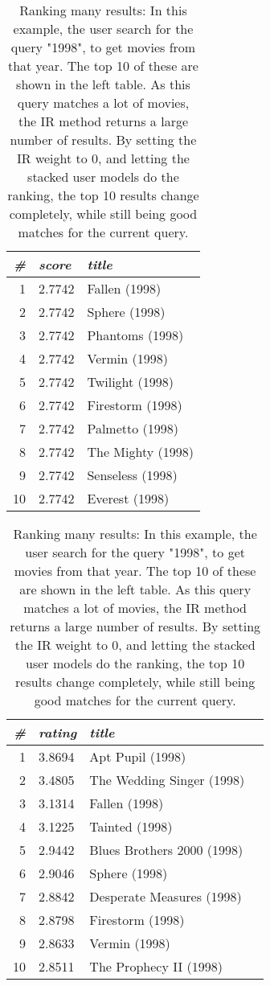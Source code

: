 \begin{table}[t]
  \centering 
  \begin{minipage}{0.49\textwidth}
    \centering 

  \begin{tabular*}{\textwidth}{ r l l }
    \toprule
    \emph{\#} & \emph{score} & \emph{title}\\
    \midrule
    1 &  2.7742  &  Fallen (1998)      \\
    2 &  2.7742  &  Sphere (1998)      \\
    3 &  2.7742  &  Phantoms (1998)    \\
    4 &  2.7742  &  Vermin (1998)      \\
    5 &  2.7742  &  Twilight (1998)    \\
    6 &  2.7742  &  Firestorm (1998)   \\
    7 &  2.7742  &  Palmetto (1998)    \\
    8 &  2.7742  &  The Mighty (1998)  \\
    9 &  2.7742  &  Senseless (1998)   \\
    10&  2.7742  &  Everest (1998)     \\
    \bottomrule
  \end{tabular*}
\end{minipage} 
\hfill 
\begin{minipage}{0.49\textwidth}
  \begin{tabular*}{\textwidth}{ r l l l }
    \toprule
    \emph{\#} & \emph{rating} & \emph{title}\\
    \midrule
    1 &  3.8694  &  Apt Pupil (1998)            \\
    2 &  3.4805  &  The Wedding Singer (1998)   \\
    3 &  3.1314  &  Fallen (1998)               \\
    4 &  3.1225  &  Tainted (1998)              \\
    5 &  2.9442  &  Blues Brothers 2000 (1998)  \\
    6 &  2.9046  &  Sphere (1998)               \\
    7 &  2.8842  &  Desperate Measures (1998)   \\
    8 &  2.8798  &  Firestorm (1998)            \\
    9 &  2.8633  &  Vermin (1998)               \\
    10&  2.8511  &  The Prophecy II (1998)      \\
    \bottomrule
  \end{tabular*}
  \end{minipage} 
  \vspace{1em}
  \caption[Ranking Many Results]{
    Ranking many results: 
    In this example, the user search for the query "1998", to get movies from that year.
    The top 10 of these are shown in the left table. As this query matches a lot of 
    movies, the IR method returns a large number of results. By setting the IR weight to $0$,
    and letting the stacked user models do the ranking, the top 10 results change completely,
    while still being good matches for the current query.
  }
  \label{table:rank:year}
\end{table}
